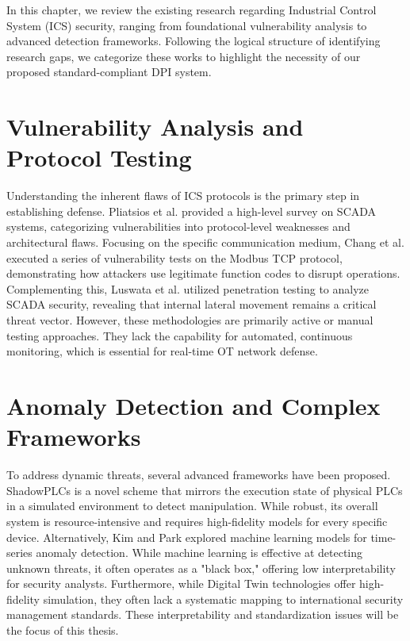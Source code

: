 In this chapter, we review the existing research regarding Industrial Control System (ICS) security, ranging from foundational vulnerability analysis to advanced detection frameworks. Following the logical structure of identifying research gaps, we categorize these works to highlight the necessity of our proposed standard-compliant DPI system.

\section{Vulnerability Analysis and Protocol Testing}
Understanding the inherent flaws of ICS protocols is the primary step in establishing defense. Pliatsios et al. \cite{ref_report25} provided a high-level survey on SCADA systems, categorizing vulnerabilities into protocol-level weaknesses and architectural flaws. Focusing on the specific communication medium, Chang et al. \cite{ref_report26} executed a series of vulnerability tests on the Modbus TCP protocol, demonstrating how attackers use legitimate function codes to disrupt operations. Complementing this, Luswata et al. \cite{ref_report27} utilized penetration testing to analyze SCADA security, revealing that internal lateral movement remains a critical threat vector. However, these methodologies are primarily active or manual testing approaches. They lack the capability for automated, continuous monitoring, which is essential for real-time OT network defense.

\section{Anomaly Detection and Complex Frameworks}
To address dynamic threats, several advanced frameworks have been proposed. ShadowPLCs \cite{ref_report28} is a novel scheme that mirrors the execution state of physical PLCs in a simulated environment to detect manipulation. While robust, its overall system is resource-intensive and requires high-fidelity models for every specific device. Alternatively, Kim and Park \cite{ref_report29} explored machine learning models for time-series anomaly detection. While machine learning is effective at detecting unknown threats, it often operates as a "black box," offering low interpretability for security analysts. Furthermore, while Digital Twin technologies \cite{ref_report30} offer high-fidelity simulation, they often lack a systematic mapping to international security management standards. These interpretability and standardization issues will be the focus of this thesis.

